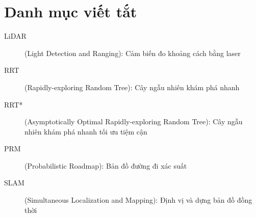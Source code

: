 
\section{Danh mục viết tắt}

\begin{description}
  \item[LiDAR] (Light Detection and Ranging): Cảm biến đo khoảng cách bằng laser
  \item[RRT] (Rapidly-exploring Random Tree): Cây ngẫu nhiên khám phá nhanh
  \item[RRT*] (Asymptotically Optimal Rapidly-exploring Random Tree): Cây
        ngẫu nhiên khám phá nhanh tối ưu tiệm cận
  \item[PRM] (Probabilistic Roadmap): Bản đồ đường đi xác suất
  \item[SLAM] (Simultaneous Localization and Mapping): Định vị và dựng bản
        đồ đồng thời
\end{description}
